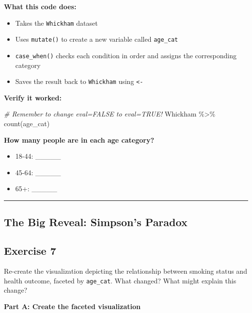 \documentclass[]{tufte-handout}
\newenvironment{Shaded}{}{}
\newcommand{\CommentTok}[1]{\textcolor[rgb]{0.38,0.63,0.69}{\textit{#1}}}
\newcommand{\FunctionTok}[1]{\textcolor[rgb]{0.02,0.16,0.49}{#1}}
\newcommand{\NormalTok}[1]{#1}
\newcommand{\SpecialCharTok}[1]{\textcolor[rgb]{0.25,0.44,0.63}{#1}}
\providecommand{\tightlist}{%
  \setlength{\itemsep}{0pt}\setlength{\parskip}{0pt}}
\begin{document}
\textbf{What this code does:}

\begin{itemize}
\tightlist
\item
  Takes the \texttt{Whickham} dataset
\item
  Uses \texttt{mutate()} to create a new variable called
  \texttt{age\_cat}
\item
  \texttt{case\_when()} checks each condition in order and assigns the
  corresponding category
\item
  Saves the result back to \texttt{Whickham} using \texttt{\textless{}-}
\end{itemize}

\textbf{Verify it worked:}

\begin{Shaded}
\begin{Highlighting}[]
\CommentTok{\# Remember to change eval=FALSE to eval=TRUE!}
\NormalTok{Whickham }\SpecialCharTok{\%\textgreater{}\%}
  \FunctionTok{count}\NormalTok{(age\_cat)}
\end{Highlighting}
\end{Shaded}

\textbf{How many people are in each age category?}

\begin{itemize}
\tightlist
\item
  18-44: \_\_\_\_\_
\item
  45-64: \_\_\_\_\_
\item
  65+: \_\_\_\_\_
\end{itemize}

\begin{center}\rule{0.5\linewidth}{0.5pt}\end{center}

\subsection{The Big Reveal: Simpson's
Paradox}\label{the-big-reveal-simpsons-paradox}

\subsection{Exercise 7}\label{exercise-7}

Re-create the visualization depicting the relationship between smoking
status and health outcome, faceted by \texttt{age\_cat}. What changed?
What might explain this change?

\textbf{Part A: Create the faceted visualization}
\end{document}
